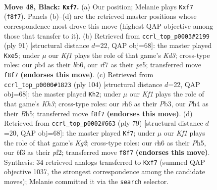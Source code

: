 \documentclass[11pt]{article}
\begin{document}
\clearpage

\begin{figure}[p]\centering
\begin{subfigure}{0.46\textwidth}\centering
\resizebox{\linewidth}{!}{%
\newchessgame
\chessboard[
  setfen={5k2/5R2/7R/8/1P5p/4KB2/2r5/8 b - - 0 48},
  showmover=false,
  pgfstyle=straightmove, color=movearrow, markmove={f8-f7}
]}
\caption{}
\end{subfigure}\hfill
\begin{subfigure}{0.46\textwidth}\centering
\resizebox{\linewidth}{!}{%
\newchessgame
\chessboard[
  setfen={8/8/1B1k4/4Pp2/2B5/2K5/6r1/8 b - - 0 46},
  showmover=false,
  pgfstyle=straightmove, color=movearrow, markmove={d6-e5}
]}
\caption{}
\end{subfigure}
\\[4pt]
\begin{subfigure}{0.46\textwidth}\centering
\resizebox{\linewidth}{!}{%
\newchessgame
\chessboard[
  setfen={6k1/8/4p3/7B/5R2/1P4rK/5b2/8 w - - 3 53},
  showmover=false,
  pgfstyle=straightmove, color=movearrow, markmove={h3-h2}
]}
\caption{}
\end{subfigure}\hfill
\begin{subfigure}{0.46\textwidth}\centering
\resizebox{\linewidth}{!}{%
\newchessgame
\chessboard[
  setfen={6R1/3P2k1/8/7p/4r3/8/p4P2/5K2 b - - 2 40},
  showmover=false,
  pgfstyle=straightmove, color=movearrow, markmove={g7-f7}
]}
\caption{}
\end{subfigure}
\caption{\textbf{Move 48, Black: \texttt{Kxf7}.} (a) Our position; Melanie plays \texttt{Kxf7} (\texttt{f8f7}). Panels (b)--(d) are the retrieved master positions whose correspondence most drove this move (highest QAP objective among those that transfer to it). (b) Retrieved from \texttt{ccrl\_top\_p0003\#2199} (ply 91) [structural distance $d$=22, QAP obj=68]: the master played \texttt{Kxe5}; under $\mu$ our \emph{Kf1} plays the role of that game's \emph{Kd3}; cross-type roles: our \emph{p}b4 as their \emph{b}b6, our \emph{r}f7 as their \emph{p}e5; transferred move \texttt{f8f7} \textbf{(endorses this move)}. (c) Retrieved from \texttt{ccrl\_top\_p0000\#1823} (ply 104) [structural distance $d$=22, QAP obj=68]: the master played \texttt{Kh2}; under $\mu$ our \emph{Kf1} plays the role of that game's \emph{Kh3}; cross-type roles: our \emph{r}h6 as their \emph{P}b3, our \emph{P}h4 as their \emph{B}h5; transferred move \texttt{f8f7} \textbf{(endorses this move)}. (d) Retrieved from \texttt{ccrl\_top\_p0002\#663} (ply 79) [structural distance $d$=20, QAP obj=68]: the master played \texttt{Kf7}; under $\mu$ our \emph{Kf1} plays the role of that game's \emph{Kg2}; cross-type roles: our \emph{r}h6 as their \emph{P}h5, our \emph{b}f3 as their \emph{p}f2; transferred move \texttt{f8f7} \textbf{(endorses this move)}. Synthesis: 34 retrieved analogs transferred to \texttt{Kxf7} (summed QAP objective 1037, the strongest correspondence among the candidate moves); Melanie committed it via the \texttt{search} selector.}
\label{fig:thought-m95}
\end{figure}
\end{document}
